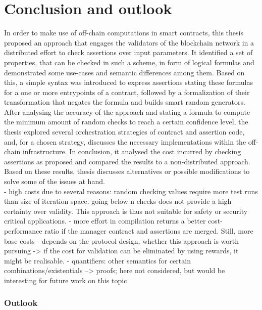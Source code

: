 \chapter{Conclusion and outlook}\label{chap:conclusion}
In order to make use of off-chain computations in smart contracts, this thesis proposed an approach that engages the validators of the blockchain network in a distributed effort to check assertions over input parameters. It identified a set of properties, that can be checked in such a scheme, in form of logical formulas and demonstrated some use-cases and semantic differences among them. Based on this, a simple syntax was introduced to express assertions stating these formulas for a one or more entrypoints of a contract, followed by a formalization of their transformation that negates the formula and builds smart random generators. After analysing the accuracy of the approach and stating a formula to compute the minimum amount of random checks to reach a certain confidence level, the thesis explored several orchestration strategies of contract and assertion code, and, for a chosen strategy, discusses the necessary implementations within the off-chain infrastructure. In conclusion, it analysed the cost incurred by checking assertions as proposed and compared the results to a non-distributed approach. Based on these results, thesis discusses alternatives or possible modifications to solve some of the issues at hand. \\


- high costs due to several reasons: random checking values require more test runs than size of iteration space. going below n checks does not provide a high certainty over validity. This approach is thus not suitable for safety or security critical applications. 
- more effort in compilation returns a better cost-performance ratio if the manager contract and assertions are merged. Still, more base costs
- depends on the protocol design, whether this approach is worth pursuing -> if the cost for validation can be eliminated by using rewards, it might be realisable.
- quantifiers: other semantics for certain combinations/existentials --> proofs; here not considered, but would be interesting for future work on this topic

\subsection{Outlook}

